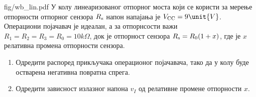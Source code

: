 \begin{slikaDesno}{fig/wb_lin.pdf}
\PID
У колу линеаризованог отпорног моста који се користи за мерење отпорности 
отпорног сензора $R_{\rm s}$ напон напајања је $V_{\rm CC} = 9\unit{V}$. 
Операциони појачавач је идеалан, а за отпорнсости важи 
$R_1 = R_2 = R_3 = R_0 = 10\unit{k\Omega}$, док је отпорност сензора $R_{\rm s} = R_0(1 + x)$, где је $x$ релативна промена 
отпорности сензора. 
\begin{enumerate}[label=(\alph*)]
\item Одредити распоред прикључака операционог појачавача, тако да у колу 
буде остварена негативна повратна спрега.
\item Одредити зависност излазног напона $v_I$ од релативне промене отпорности $x$.
\end{enumerate}

\end{slikaDesno}
\REZULTAT
